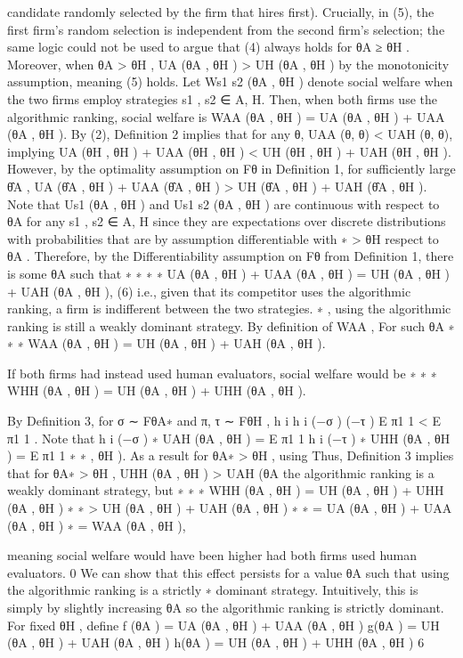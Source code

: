 \documentclass[10pt]{article}
\begin{document}
\begin{ReviewVerbatim}
candidate randomly selected by the firm that hires first). Crucially, in (5), the first firm’s random selection
is independent from the second firm’s selection; the same logic could not be used to argue that (4) always
holds for θA ≥ θH . Moreover, when θA > θH , UA (θA , θH ) > UH (θA , θH ) by the monotonicity assumption,
meaning (5) holds.
Let Ws1 s2 (θA , θH ) denote social welfare when the two firms employ strategies s1 , s2 ∈ {A, H}. Then,
when both firms use the algorithmic ranking, social welfare is
WAA (θA , θH ) = UA (θA , θH ) + UAA (θA , θH ).
By (2), Definition 2 implies that for any θ, UAA (θ, θ) < UAH (θ, θ), implying
UA (θH , θH ) + UAA (θH , θH ) < UH (θH , θH ) + UAH (θH , θH ).
However, by the optimality assumption on Fθ in Definition 1, for sufficiently large θ̂A ,
UA (θ̂A , θH ) + UAA (θ̂A , θH ) > UH (θ̂A , θH ) + UAH (θ̂A , θH ).
Note that Us1 (θA , θH ) and Us1 s2 (θA , θH ) are continuous with respect to θA for any s1 , s2 ∈ {A, H} since
they are expectations over discrete distributions with probabilities that are by assumption differentiable with
∗
> θH
respect to θA . Therefore, by the Differentiability assumption on Fθ from Definition 1, there is some θA
such that
∗
∗
∗
∗
UA (θA
, θH ) + UAA (θA
, θH ) = UH (θA
, θH ) + UAH (θA
, θH ),
(6)
i.e., given that its competitor uses the algorithmic ranking, a firm is indifferent between the two strategies.
∗
, using the algorithmic ranking is still a weakly dominant strategy. By definition of WAA ,
For such θA
∗
∗
∗
WAA (θA
, θH ) = UH (θA
, θH ) + UAH (θA
, θH ).

If both firms had instead used human evaluators, social welfare would be
∗
∗
∗
WHH (θA
, θH ) = UH (θA
, θH ) + UHH (θA
, θH ).

By Definition 3, for σ ∼ FθA∗ and π, τ ∼ FθH ,
h
i
h
i
(−{σ })
(−{τ })
E π1 1
< E π1 1 .
Note that
h
i
(−{σ })
∗
UAH (θA
, θH ) = E π1 1
h
i
(−{τ })
∗
UHH (θA
, θH ) = E π1 1
∗
∗
, θH ). As a result for θA∗ > θH , using
Thus, Definition 3 implies that for θA∗ > θH , UHH (θA
, θH ) > UAH (θA
the algorithmic ranking is a weakly dominant strategy, but
∗
∗
∗
WHH (θA
, θH ) = UH (θA
, θH ) + UHH (θA
, θH )
∗
∗
> UH (θA
, θH ) + UAH (θA
, θH )
∗
∗
= UA (θA
, θH ) + UAA (θA
, θH )
∗
= WAA (θA
, θH ),

meaning social welfare would have been higher had both firms used human evaluators.
0
We can show that this effect persists for a value θA
such that using the algorithmic ranking is a strictly
∗
dominant strategy. Intuitively, this is simply by slightly increasing θA
so the algorithmic ranking is strictly
dominant. For fixed θH , define
f (θA ) = UA (θA , θH ) + UAA (θA , θH )
g(θA ) = UH (θA , θH ) + UAH (θA , θH )
h(θA ) = UH (θA , θH ) + UHH (θA , θH )
6



\end{ReviewVerbatim}
\end{document}
